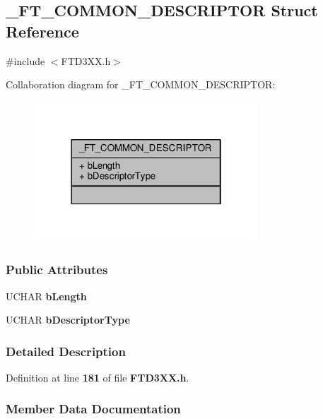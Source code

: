 \subsection{\+\_\+\+F\+T\+\_\+\+C\+O\+M\+M\+O\+N\+\_\+\+D\+E\+S\+C\+R\+I\+P\+T\+OR Struct Reference}
\label{struct__FT__COMMON__DESCRIPTOR}


{\ttfamily \#include $<$F\+T\+D3\+X\+X.\+h$>$}



Collaboration diagram for \+\_\+\+F\+T\+\_\+\+C\+O\+M\+M\+O\+N\+\_\+\+D\+E\+S\+C\+R\+I\+P\+T\+OR\+:
\nopagebreak
\begin{figure}[H]
\begin{center}
\leavevmode
\includegraphics[width=238pt]{d0/d00/struct__FT__COMMON__DESCRIPTOR__coll__graph}
\end{center}
\end{figure}
\subsubsection*{Public Attributes}
\begin{DoxyCompactItemize}
\item 
U\+C\+H\+AR {\bf b\+Length}
\item 
U\+C\+H\+AR {\bf b\+Descriptor\+Type}
\end{DoxyCompactItemize}


\subsubsection{Detailed Description}


Definition at line {\bf 181} of file {\bf F\+T\+D3\+X\+X.\+h}.



\subsubsection{Member Data Documentation}

